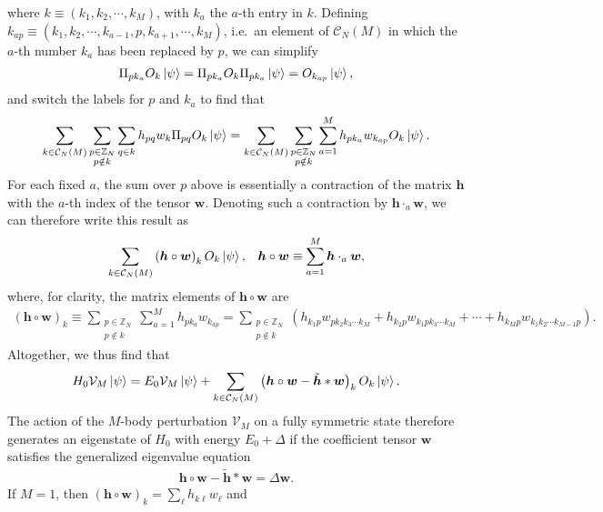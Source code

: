 \documentclass[nofootinbib,notitlepage,11pt]{revtex4-2}
\newcommand{\p}[1]{\left(#1\right)} %
\renewcommand{\c}{\cdot} %
\newcommand{\m}{\bm} %
\newcommand{\1}{\mathds{1}}
\newcommand{\C}{\mathcal{C}}
\newcommand{\V}{\mathcal{V}}
\newcommand{\ZZ}{\mathbb{Z}}
\begin{document}
where $k\equiv\p{k_1,k_2,\cdots,k_M}$, with $k_a$ the $a$-th entry in
$k$.  Defining
$k_{ap}\equiv\p{k_1,k_2,\cdots,k_{a-1},p,k_{a+1},\cdots,k_M}$, i.e.~an
element of $\C_N\p{M}$ in which the $a$-th number $k_a$ has been
replaced by $p$, we can simplify
\begin{align}
  \Pi_{p k_a} O_k \ket\psi
  = \Pi_{p k_a} O_k \Pi_{p k_a} \ket\psi
  = O_{k_{ap}}\ket\psi,
\end{align}
and switch the labels for $p$ and $k_a$ to find that
\begin{align}
  \sum_{k\in\C_N\p{M}} \sum_{\substack{p\in\ZZ_N\\p\notin k}} \sum_{q\in k}
  h_{pq} w_k  \Pi_{pq} O_k \ket\psi
  = \sum_{k\in\C_N\p{M}} \sum_{\substack{p\in\ZZ_N\\p\notin k}}
  \sum_{a=1}^M h_{pk_a} w_{k_{ap}} O_k \ket\psi.
\end{align}
For each fixed $a$, the sum over $p$ above is essentially a
contraction of the matrix $\m h$ with the $a$-th index of the tensor
$\m w$.  Denoting such a contraction by $\m h\c_a\m w$, we can
therefore write this result as
\begin{align}
  \sum_{k\in\C_N\p{M}} \p{\m h\circ \m w}_k O_k \ket\psi,
  &&
  \m h\circ\m w \equiv \sum_{a=1}^M \m h\c_a\m w,
\end{align}
where, for clarity, the matrix elements of $\m h\circ\m w$ are
\begin{align}
  \p{\m h\circ\m w}_k
  \equiv \sum_{\substack{p\in\ZZ_N\\p\notin k}} \sum_{a=1}^M
  h_{pk_a} w_{k_{ap}}
  = \sum_{\substack{p\in\ZZ_N\\p\notin k}}
  \p{h_{k_1 p} w_{pk_2k_3\cdots k_M}
    + h_{k_2 p} w_{k_1pk_3\cdots k_M}
    + \cdots + h_{k_M p} w_{k_1k_2\cdots k_{M-1} p}}.
\end{align}
Altogether, we thus find that
\begin{align}
  H_0 \V_M \ket\psi
  = E_0 \V_M \ket\psi + \sum_{k\in\C_N\p{M}}
  \p{\m h\circ\m w - \tilde{\m h} * \m w}_k O_k \ket\psi.
  \label{eq:H_VM_psi_end}
\end{align}
The action of the $M$-body perturbation $\V_M$ on a fully symmetric
state therefore generates an eigenstate of $H_0$ with energy
$E_0+\Delta$ if the coefficient tensor $\m w$ satisfies the
generalized eigenvalue equation
\begin{align}
  \m h\circ\m w - \tilde{\m h} * \m w = \Delta \m w.
  \label{eq:H_VM_psi_eig}
\end{align}
If $M=1$, then $\p{\m h\circ\m w}_k=\sum_\ell h_{k\ell}w_\ell$ and
\end{document}
